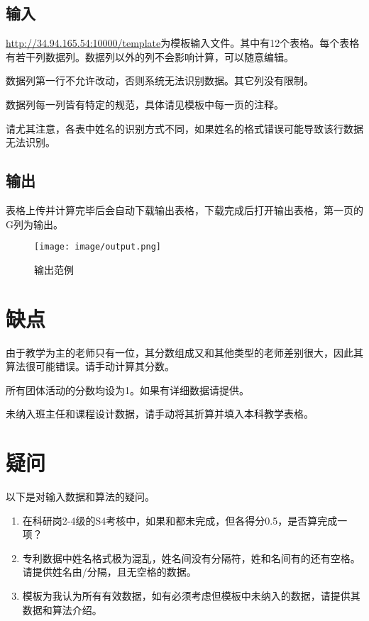 \documentclass[UTF8,fontset=windowsnew]{ctexart}
\newcommand*\circled[1]{\tikz[baseline=(char.base)]{\node[shape=circle,draw,inner sep=2pt] (char) {#1};}}
\begin{document}
\subsection{输入}
\url{http://34.94.165.54:10000/template}为模板输入文件。其中有12个表格。每个表格有若干列数据列。数据列以外的列不会影响计算，可以随意编辑。\par
数据列第一行不允许改动，否则系统无法识别数据。其它列没有限制。\par
数据列每一列皆有特定的规范，具体请见模板中每一页的注释。\par
请尤其注意，各表中姓名的识别方式不同，如果姓名的格式错误可能导致该行数据无法识别。
\subsection{输出}
表格上传并计算完毕后会自动下载输出表格，下载完成后打开输出表格，第一页的G列为输出。\par
\begin{figure}[h]
  \centering
  \texttt{[image: image/output.png]}
  \caption{输出范例}
  \label{fig:output}
\end{figure}
\section{缺点}
由于教学为主的老师只有一位，其分数组成又和其他类型的老师差别很大，因此其算法很可能错误。请手动计算其分数。\par
所有团体活动的分数均设为1。如果有详细数据请提供。\par
未纳入班主任和课程设计数据，请手动将其折算并填入本科教学表格。\par
\section{疑问}
以下是对输入数据和算法的疑问。
\begin{enumerate}
  \item 在科研岗2-4级的S4考核中，如果\circled{1}和\circled{2}都未完成，但各得分0.5，是否算完成一项？
  \item 专利数据中姓名格式极为混乱，姓名间没有分隔符，姓和名间有的还有空格。请提供姓名由/分隔，且无空格的数据。
  \item 模板为我认为所有有效数据，如有必须考虑但模板中未纳入的数据，请提供其数据和算法介绍。
\end{enumerate}
\end{document}
